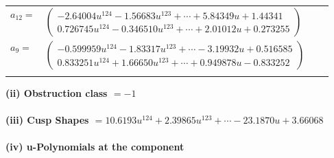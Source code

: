 \documentclass[1p]{elsarticle_modified}
\theoremstyle{definition}
\begin{document}
\begin{tabular}{m{7pt} m{180pt} m{7pt} m{180pt} }
\flushright $a_{12}=$&$\begin{pmatrix}-2.64004 u^{124}-1.56683 u^{123}+\cdots+5.84349 u+1.44341\\0.726745 u^{124}-0.346510 u^{123}+\cdots+2.01012 u+0.273255\end{pmatrix}$ \\
\flushright $a_{9}=$&$\begin{pmatrix}-0.599959 u^{124}-1.83317 u^{123}+\cdots-3.19932 u+0.516585\\0.833251 u^{124}+1.66650 u^{123}+\cdots+0.949878 u-0.833252\end{pmatrix}$\\&\end{tabular}
\flushleft \textbf{(ii) Obstruction class $= -1$}\\~\\
\flushleft \textbf{(iii) Cusp Shapes $= 10.6193 u^{124}+2.39865 u^{123}+\cdots-23.1870 u+3.66068$}\\~\\
\newpage\renewcommand{\arraystretch}{1}
\flushleft \textbf{(iv) u-Polynomials at the component}\newline \\
\end{document}
